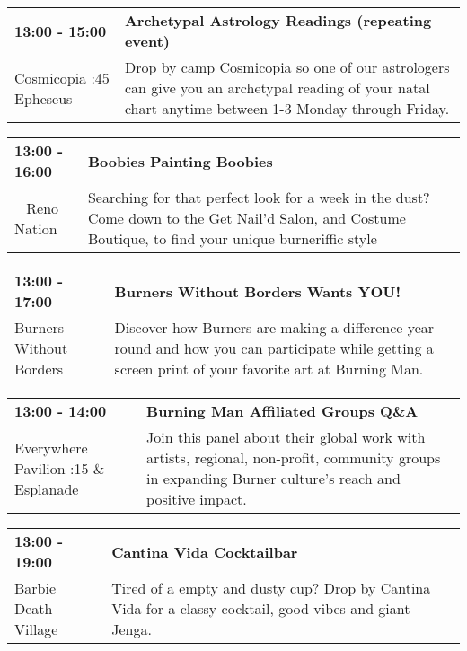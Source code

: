\begin{tabular}{ p{1in} p{2.2in} }
    \textbf{13:00 - 15:00} & \textbf{Archetypal Astrology Readings (repeating event)} \\
    Cosmicopia \newline 3:45 Epheseus & Drop by camp Cosmicopia so one of our astrologers can give you an archetypal reading of your natal chart anytime between 1-3 Monday through Friday. \\
    \hline 
\end{tabular}
    
\begin{tabular}{ p{1in} p{2.2in} }
    \textbf{13:00 - 16:00} & \textbf{Boobies Painting Boobies} \\
    ~ \newline Reno Nation & Searching for that perfect look for a week in the dust? Come down to the Get Nail'd Salon, and Costume Boutique, to find your unique burneriffic style \\
    \hline 
\end{tabular}
    
\begin{tabular}{ p{1in} p{2.2in} }
    \textbf{13:00 - 17:00} & \textbf{Burners Without Borders Wants YOU!} \\
    Burners Without Borders \newline  & Discover how Burners are making a difference year-round and how you can participate while getting a screen print of your favorite art at Burning Man. \\
    \hline 
\end{tabular}
    
\begin{tabular}{ p{1in} p{2.2in} }
    \textbf{13:00 - 14:00} & \textbf{Burning Man Affiliated Groups Q\&A} \\
    Everywhere Pavilion \newline 6:15 \& Esplanade & Join this panel about their global work with artists, regional, non-profit, community groups in expanding Burner culture's reach and positive impact. \\
    \hline 
\end{tabular}
    
\begin{tabular}{ p{1in} p{2.2in} }
    \textbf{13:00 - 19:00} & \textbf{Cantina Vida Cocktailbar} \\
    Barbie Death Village \newline  & Tired of a empty and dusty cup? Drop by Cantina Vida for a classy cocktail, good vibes and giant Jenga. \\
    \hline 
\end{tabular}
    
